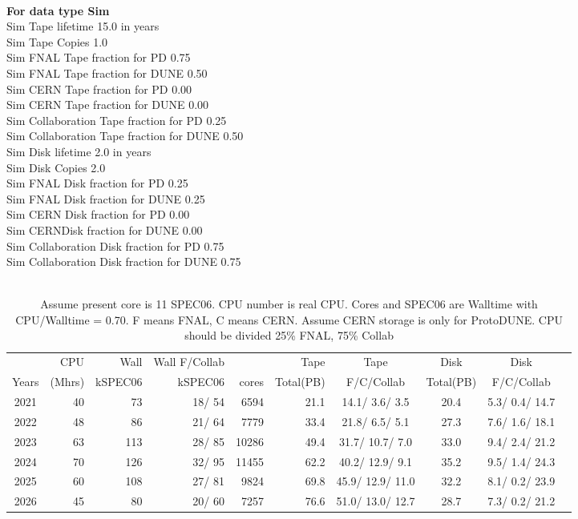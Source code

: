 \documentclass[12pt]{article}
\begin{document}
\\
{\bf For data type Sim}\\
   Sim Tape lifetime  15.0 in years\\
   Sim Tape Copies   1.0\\
   Sim FNAL Tape fraction for PD  0.75\\
   Sim FNAL Tape fraction for DUNE  0.50\\
   Sim CERN Tape fraction for PD  0.00\\
   Sim CERN Tape fraction for DUNE  0.00\\
   Sim Collaboration Tape fraction for PD  0.25\\
   Sim Collaboration Tape fraction for DUNE  0.50\\
   Sim Disk lifetime   2.0 in years\\
   Sim Disk Copies   2.0\\
   Sim FNAL Disk fraction for PD  0.25\\
   Sim FNAL Disk fraction for DUNE  0.25\\
   Sim CERN Disk fraction for PD  0.00\\
   Sim CERNDisk fraction for DUNE  0.00\\
   Sim Collaboration Disk fraction for PD  0.75\\
   Sim Collaboration Disk fraction for DUNE  0.75\\
\pagebreak\\
\begin{table}
\footnotesize
 \centering \begin{tabular}[h]{crrrrrcccc}
 & CPU &Wall&Wall F/Collab&\qquad  & Tape\qquad& Tape\qquad  & Disk\qquad  & Disk\qquad \\
Years&(Mhrs)&kSPEC06&kSPEC06&cores& Total(PB)&F/C/Collab & Total(PB) &F/C/Collab\\
\hline
2021&	  40&	  73&	  18/  54&	  6594&	     21.1&	  14.1/  3.6/  3.5&	     20.4&	   5.3/  0.4/ 14.7\\
2022&	  48&	  86&	  21/  64&	  7779&	     33.4&	  21.8/  6.5/  5.1&	     27.3&	   7.6/  1.6/ 18.1\\
2023&	  63&	 113&	  28/  85&	 10286&	     49.4&	  31.7/ 10.7/  7.0&	     33.0&	   9.4/  2.4/ 21.2\\
2024&	  70&	 126&	  32/  95&	 11455&	     62.2&	  40.2/ 12.9/  9.1&	     35.2&	   9.5/  1.4/ 24.3\\
2025&	  60&	 108&	  27/  81&	  9824&	     69.8&	  45.9/ 12.9/ 11.0&	     32.2&	   8.1/  0.2/ 23.9\\
2026&	  45&	  80&	  20/  60&	  7257&	     76.6&	  51.0/ 13.0/ 12.7&	     28.7&	   7.3/  0.2/ 21.2\\
\end{tabular}
\caption{Assume present core is   11 SPEC06. CPU number is real CPU. Cores and SPEC06 are Walltime with CPU/Walltime =  0.70.  F means FNAL, C means CERN. Assume CERN storage is only  for ProtoDUNE. CPU should be divided 25\% FNAL, 75\% Collab}\normalsize
 \end{table}
\end{document}
